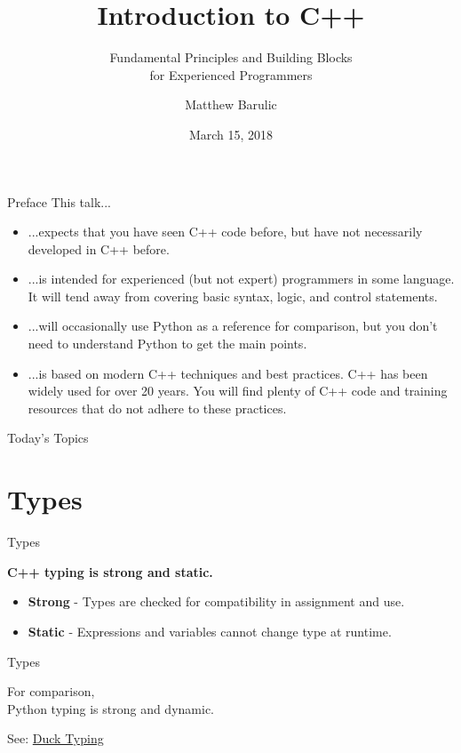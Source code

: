 \documentclass{beamer}
\author{Matthew Barulic}
\date{March 15, 2018}
\title{Introduction to C++}
\subtitle{Fundamental Principles and Building Blocks\\ for Experienced Programmers}
\institute{
	Wheego Technologies
}
\begin{document}
	
	\begin{frame}
		\titlepage
	\end{frame}
	
	\begin{frame}{Preface}
		This talk...
		\begin{itemize}
			\item ...expects that you have seen C++ code before, but have not necessarily developed in C++ before.
			\item ...is intended for experienced (but not expert) programmers in some language. It will tend away from covering basic syntax, logic, and control statements.
			\item ...will occasionally use Python as a reference for comparison, but you don't need to understand Python to get the main points.
			\item ...is based on modern C++ techniques and best practices. C++ has been widely used for over 20 years. You will find plenty of C++ code and training resources that do not adhere to these practices.
		\end{itemize}
	\end{frame}
	
	\begin{frame}{Today's Topics}
		\tableofcontents
	\end{frame}
	
	\section{Types}
	
	\begin{frame}{Types}
		\begin{center}
			\textbf{C++ typing is strong and static.}
		\end{center}
		\bigskip
		\begin{itemize}
			\item \textbf{Strong} - Types are checked for compatibility in assignment and use.
			\item \textbf{Static} - Expressions and variables cannot change type at runtime.
		\end{itemize}
	\end{frame}
	
	\begin{frame}{Types}
		\begin{center}
			For comparison,\\
			Python typing is strong and dynamic. 
		\end{center}
		\bigskip
		\begin{center}
			See: \href{https://en.wikipedia.org/wiki/Duck_typing}{Duck Typing}
		\end{center}
	\end{frame}
	
\end{document}
